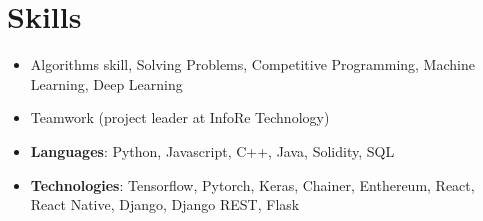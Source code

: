 \documentclass[letterpaper,11pt]{article}
\newcommand{\resumeItem}[2]{
  \item\small{
    \textbf{#1}{: #2 \vspace{-2pt}}
  }
}
\newcommand{\resumeSubItem}[2]{\resumeItem{#1}{#2}\vspace{-4pt}}
\newcommand{\resumeSubHeadingListStart}{\begin{itemize}[leftmargin=*]}
\newcommand{\resumeSubHeadingListEnd}{\end{itemize}}
\begin{document}
\section{Skills}
	\resumeSubHeadingListStart
		\item{}{Algorithms skill, Solving Problems, Competitive Programming, Machine Learning, Deep Learning}
		\item{}{Teamwork (project leader at InfoRe Technology)}
		\item
		\textbf{Languages}{: Python, Javascript, C++, Java, Solidity, SQL}
		\item
		\textbf{Technologies}{: Tensorflow, Pytorch, Keras, Chainer, Enthereum, React, React Native, Django, Django REST, Flask}
	\resumeSubHeadingListEnd



\end{document}
